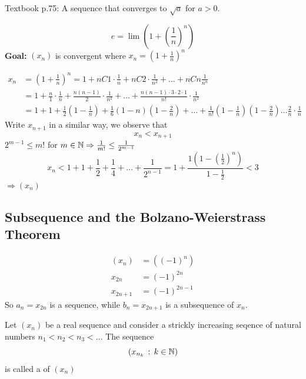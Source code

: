 \documentclass[a4paper,12pt]{article}
\begin{document}
Textbook p.75: A sequence that converges to \(\sqrt{a}\) for \(a>0\).\newpage
\begin{definition}
    \[e = \lim(1+(\frac{1}{n})^n)\]
    \textbf{Goal: } \((x_n)\) is convergent where \(x_n=(1+\frac{1}{n})^n\)
    
    \begin{align*}
        x_n & = (1+\frac{1}{n})^n=1+nC1\cdot\frac{1}{n}+nC2\cdot\frac{1}{n^2}+\dots+nCn\frac{1}{n^n}\\
        & = 1+\frac{n}{1}\cdot\frac{1}{n}+\frac{n(n-1)}{2}\cdot\frac{1}{n^2}+\dots+\frac{n(n-1)\cdot3\cdot2\cdot1}{n!}\cdot\frac{1}{n^2}\\   
        & = 1 + 1+\frac{1}{2}(1-\frac{1}{n})+\frac{1}{6}(1-n)(1-\frac{2}{n})+\dots+\frac{1}{n!}(1-\frac{1}{n})(1-\frac{2}{n})\dots\frac{2}{n}\cdot\frac{1}{n}
    \end{align*}
    Write \(x_{n+1}\) in a similar way, we observe that \[x_n < x_{n+1}\]
     \(2^{m-1}\le m!\) for \(m \in \mathbb{N}\Rightarrow \frac{1}{m!}\le\frac{1}{2^{m-1}}\)
    \[x_n<1+1+\frac{1}{2}+\frac{1}{4}+\dots+\frac{1}{2^{n-1}} = 1+\frac{1(1-(\frac{1}{2})^n)}{1-\frac{1}{2}}<3\]
    \(\Rightarrow(x_n) \)
\end{definition}

\newpage

\subsection{Subsequence and the Bolzano-Weierstrass Theorem}
\begin{example}
    \begin{align*}
        (x_n) &= ((-1)^n)\\
        x_{2n} &= (-1)^{2n}\\
        x_{2n+1} &= (-1)^{2n-1}
    \end{align*}
    So \(a_n = x_{2n}\) is a sequence, while \(b_n = x_{2n+1}\) is a subsequence of \(x_n\).
\end{example}

\begin{definition}
    Let \((x_n)\) be a real sequence and consider a strickly increasing seqence of natural numbers 
    \(n_1<n_2<n_3<\dots\)
    The sequence \[(x_{n_k}\,:\,k\in\mathbb{N})\]
    is called a  of \((x_n)\)\\
\end{definition}
\end{document}
